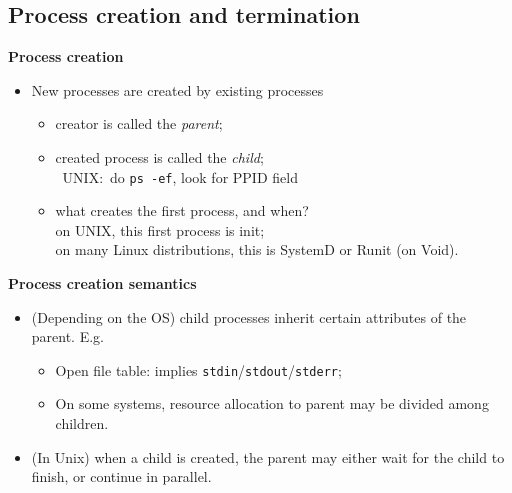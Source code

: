 \documentclass[11pt,a4paper]{article}
\begin{document}
\subsection{Process creation and termination}

\textbf{Process creation}
\begin{itemize}
    \item New processes are created by existing processes
        \begin{itemize}
            \item creator is called the \emph{parent};
            \item created process is called the \emph{child};\\\
                UNIX:\ do \texttt{ps -ef}, look for PPID field
            \item what creates the first process, and when? \\
                on UNIX, this first process is init; \\
                on many Linux distributions, this is SystemD or Runit (on Void).
        \end{itemize}
\end{itemize}

\textbf{Process creation semantics}
\begin{itemize}
    \item (Depending on the OS) child processes inherit certain attributes of the parent.
        E.g.
        \begin{itemize}
            \item Open file table: implies \texttt{stdin}/\texttt{stdout}/\texttt{stderr};
            \item On some systems, resource allocation to parent may be divided among children.
        \end{itemize}
    \item (In Unix) when a child is created, the parent may either wait for the child to
        finish, or continue in parallel.
\end{itemize}
\end{document}
